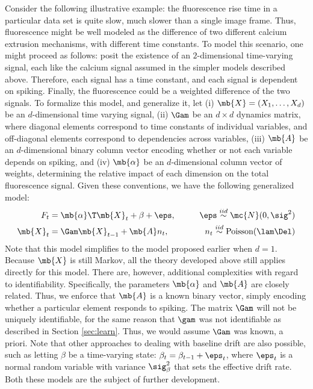 Consider the following illustrative example: the fluorescence rise time in a particular data set is quite slow, much slower than a single image frame.  Thus, fluorescence might be well modeled as the difference of two different calcium extrusion mechanisms, with different time constants. To model this scenario, one might proceed as follows: posit the existence of an $2$-dimensional time-varying signal, each like the calcium signal assumed in the simpler models described above.  Therefore, each signal has a time constant, and each signal is dependent on spiking.  Finally, the fluorescence could be a weighted difference of the two signals.  To formalize this model, and generalize it, let (i) $\mb{X}=(X_1, \ldots, X_d)$  be an $d$-dimensional time varying signal, (ii) $\Gam$ be an $d\times d$ dynamics matrix, where diagonal elements correspond to time constants of individual variables, and off-diagonal elements correspond to dependencies across variables, (iii) $\mb{A}$ be an $d$-dimensional binary column vector encoding whether or not each variable depends on spiking, and (iv) $\mb{\alpha}$ be an $d$-dimensional column vector of weights, determining the relative impact of each dimension on the total fluorescence signal.  Given these conventions, we have the following generalized model:
\begin{align}
	F_t &= \mb{\alpha}\T \mb{X}_t + \beta + \eps, \qquad& \eps \overset{iid}{\sim} \mc{N}(0,\sig^2) \\
	\mb{X}_t &= \Gam \mb{X}_{t-1} + \mb{A} n_t, & n_t \overset{iid}{\sim} \text{Poisson}(\lam\Del)
\end{align}
Note that this model simplifies to the model proposed earlier when $d=1$.  Because $\mb{X}$ is still Markov, all the theory developed above still applies directly for this model.  There are, however, additional complexities with regard to identifiability.  Specifically, the parameters $\mb{\alpha}$ and $\mb{A}$ are closely related.  Thus, we enforce that $\mb{A}$ is a known binary vector, simply encoding whether a particular element responds to spiking.  The matrix $\Gam$ will not be uniquely identifiable, for the same reason that $\gam$ was not identifiable as described in Section \ref{sec:learn}.  Thus,  we would assume $\Gam$ was known, a priori.  Note that other approaches to dealing with baseline drift are also possible, such as letting $\beta$ be a time-varying state: $\beta_t = \beta_{t-1} +  \eps_t$, where $\eps_t$ is a normal random variable with variance $\sig_\beta^2$ that sets the effective drift rate.  Both these models are the subject of further development.

